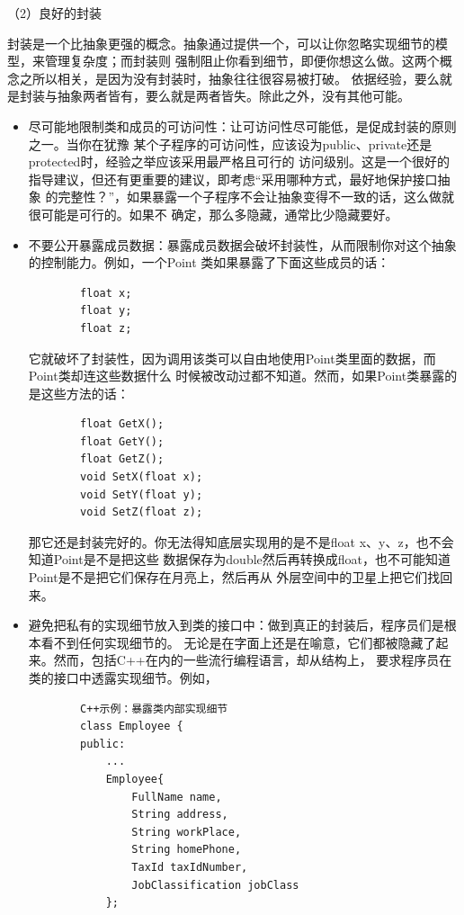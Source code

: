 \documentclass{article}
\begin{document}
\par
（2）良好的封装
\par
封装是一个比抽象更强的概念。抽象通过提供一个，可以让你忽略实现细节的模型，来管理复杂度；而封装则
强制阻止你看到细节，即便你想这么做。这两个概念之所以相关，是因为没有封装时，抽象往往很容易被打破。
依据经验，要么就是封装与抽象两者皆有，要么就是两者皆失。除此之外，没有其他可能。
\begin{itemize}
    \item 尽可能地限制类和成员的可访问性：让可访问性尽可能低，是促成封装的原则之一。当你在犹豫
    某个子程序的可访问性，应该设为public、private还是protected时，经验之举应该采用最严格且可行的
    访问级别。这是一个很好的指导建议，但还有更重要的建议，即考虑“采用哪种方式，最好地保护接口抽象
    的完整性？”，如果暴露一个子程序不会让抽象变得不一致的话，这么做就很可能是可行的。如果不
    确定，那么多隐藏，通常比少隐藏要好。
    \item 不要公开暴露成员数据：暴露成员数据会破坏封装性，从而限制你对这个抽象的控制能力。例如，一个Point
    类如果暴露了下面这些成员的话：
    \begin{lstlisting}
        float x;
        float y;
        float z;
    \end{lstlisting}
    它就破坏了封装性，因为调用该类可以自由地使用Point类里面的数据，而Point类却连这些数据什么
    时候被改动过都不知道。然而，如果Point类暴露的是这些方法的话：
    \begin{lstlisting}
        float GetX();
        float GetY();
        float GetZ();
        void SetX(float x);
        void SetY(float y);
        void SetZ(float z);
    \end{lstlisting}
    那它还是封装完好的。你无法得知底层实现用的是不是float x、y、z，也不会知道Point是不是把这些
    数据保存为double然后再转换成float，也不可能知道Point是不是把它们保存在月亮上，然后再从
    外层空间中的卫星上把它们找回来。
    \item 避免把私有的实现细节放入到类的接口中：做到真正的封装后，程序员们是根本看不到任何实现细节的。
    无论是在字面上还是在喻意，它们都被隐藏了起来。然而，包括C++在内的一些流行编程语言，却从结构上，
    要求程序员在类的接口中透露实现细节。例如，
    \begin{lstlisting}
        C++示例：暴露类内部实现细节
        class Employee {
        public:
            ...
            Employee{
                FullName name,
                String address,
                String workPlace,
                String homePhone,
                TaxId taxIdNumber,
                JobClassification jobClass
            };

\end{lstlisting}
\end{itemize}
\end{document}
